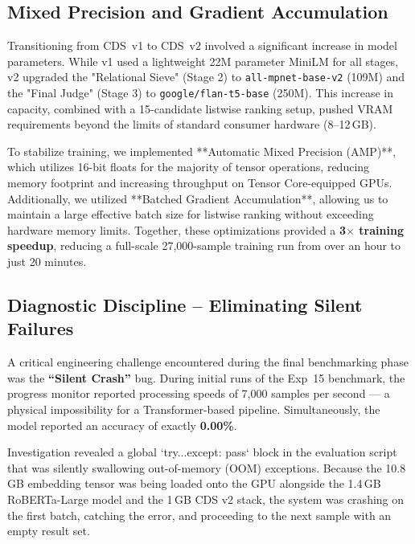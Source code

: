 \documentclass[11pt,a4paper]{article}
\begin{document}
\subsection{Mixed Precision and Gradient Accumulation}
Transitioning from CDS~v1 to CDS~v2 involved a significant increase in model
parameters.
While v1 used a lightweight 22M parameter MiniLM for all stages, v2 upgraded
the "Relational Sieve" (Stage 2) to \texttt{all-mpnet-base-v2} (109M) and the
"Final Judge" (Stage 3) to \texttt{google/flan-t5-base} (250M).
This increase in capacity, combined with a 15-candidate listwise
ranking setup, pushed VRAM requirements beyond the limits of standard consumer
hardware (8--12\,GB).

To stabilize training, we implemented **Automatic Mixed Precision (AMP)**,
which utilizes 16-bit floats for the majority of tensor operations, reducing
memory footprint and increasing throughput on Tensor Core-equipped GPUs.
Additionally, we utilized **Batched Gradient Accumulation**, allowing us to
maintain a large effective batch size for listwise ranking without exceeding
hardware memory limits.
Together, these optimizations provided a \textbf{3$\times$ training speedup},
reducing a full-scale 27,000-sample training run from over an hour to just
20 minutes.

\subsection{Diagnostic Discipline -- Eliminating Silent Failures}
A critical engineering challenge encountered during the final benchmarking phase
was the \textbf{``Silent Crash''} bug. 
During initial runs of the Exp~15 benchmark, the progress monitor reported
processing speeds of 7,000 samples per second --- a physical impossibility for
a Transformer-based pipeline.
Simultaneously, the model reported an accuracy of exactly \textbf{0.00\%}.

Investigation revealed a global `try...except: pass` block in the evaluation
script that was silently swallowing out-of-memory (OOM) exceptions.
Because the 10.8\,GB embedding tensor was being loaded onto the GPU alongside
the 1.4\,GB RoBERTa-Large model and the 1\,GB CDS v2 stack, the system was
crashing on the first batch, catching the error, and proceeding to the next
sample with an empty result set.
\end{document}
